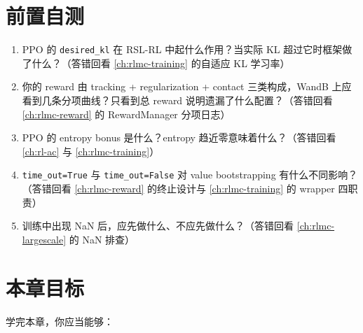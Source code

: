 \section*{前置自测}
\label{sec:rlmc-diag-pretest}

\begin{practice}
\begin{enumerate}
  \item PPO 的 \verb|desired_kl| 在 RSL-RL 中起什么作用？当实际 KL 超过它时框架做了什么？（答错回看 \cref{ch:rlmc-training} 的自适应 KL 学习率）
  \item 你的 reward 由 tracking + regularization + contact 三类构成，WandB 上应看到几条分项曲线？只看到总 reward 说明遗漏了什么配置？（答错回看 \cref{ch:rlmc-reward} 的 RewardManager 分项日志）
  \item PPO 的 entropy bonus 是什么？entropy 趋近零意味着什么？（答错回看 \cref{ch:rl-ac} 与 \cref{ch:rlmc-training}）
  \item \verb|time_out=True| 与 \verb|time_out=False| 对 value bootstrapping 有什么不同影响？（答错回看 \cref{ch:rlmc-reward} 的终止设计与 \cref{ch:rlmc-training} 的 wrapper 四职责）
  \item 训练中出现 NaN 后，应先做什么、不应先做什么？（答错回看 \cref{ch:rlmc-largescale} 的 NaN 排查）
\end{enumerate}
\end{practice}

\section*{本章目标}
\label{sec:rlmc-diag-goals}

学完本章，你应当能够：

